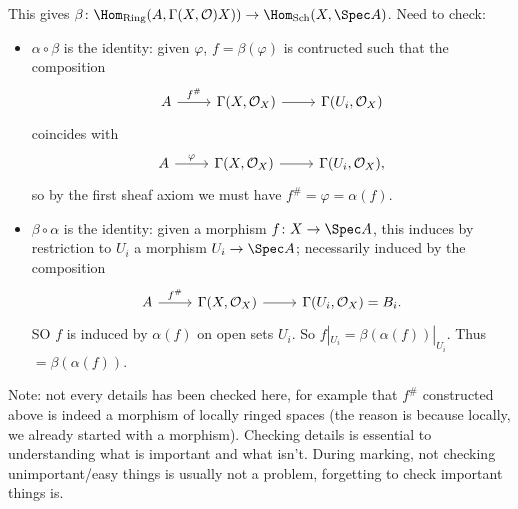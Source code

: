 This gives $\beta\colon \Hom_{\text{Ring}}(A, \Gamma(X, \mathcal{O})X))\to \Hom_{\text{Sch}}(X, \Spec A)$.
Need to check:
\begin{itemize}
	\item $\alpha \circ \beta$ is the identity: given $\varphi$, $f = \beta(\varphi)$ is contructed
		such that the composition
		\[\begin{tikzcd}
			A\ar[r, "f^\#"] & \Gamma(X, \mathcal{O}_X)\ar[r] & \Gamma(U_i, \mathcal{O}_X)
		\end{tikzcd}\]
		coincides with
		\[\begin{tikzcd}
			A\ar[r, "\varphi"] & \Gamma(X, \mathcal{O}_X)\ar[r] & \Gamma(U_i, \mathcal{O}_X),
		\end{tikzcd}\]
		so by the first sheaf axiom we must have $f^\# = \varphi = \alpha(f)$.
	\item $\beta \circ \alpha$ is the identity: given a morphism
		$f\colon X\to \Spec A$, this induces by restriction to $U_i$ a morphism
		$U_i\to \Spec A$; necessarily induced by the composition
		\[\begin{tikzcd}
			A\ar[r, "f^\#"] & \Gamma(X, \mathcal{O}_X)\ar[r] & \Gamma(U_i, \mathcal{O}_X) = B_i.
		\end{tikzcd}\]
		SO $f$ is induced by $\alpha(f)$ on open sets $U_i$. So $f|_{U_i} = \beta(\alpha(f))|_{U_i}$.
		Thus $ = \beta(\alpha(f))$.
\end{itemize}

Note: not every details has been checked here, for example that $f^\#$ constructed above
is indeed a morphism of locally ringed spaces (the reason is because locally, we
already started with a morphism). Checking details is essential to understanding what
is important and what isn't. During marking, not checking unimportant/easy things is
usually not a problem, forgetting to check important things is.

